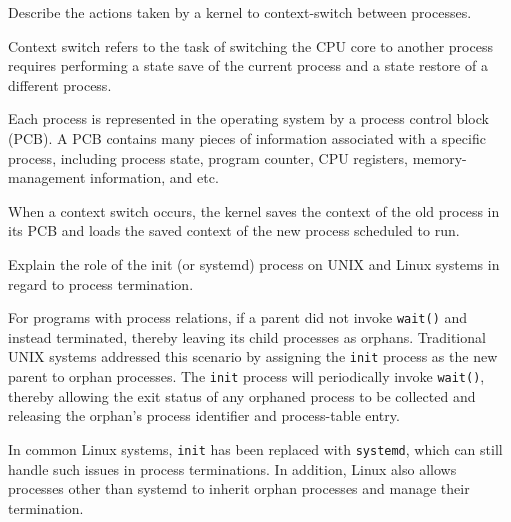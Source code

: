 \begin{exercise}[]{Describe the actions taken by a kernel to context-switch between processes.}
  \begin{solution}

Context switch refers to the task of switching the CPU core to another process requires performing a state save of the current process and a state restore of a different process.

    Each process is represented in the operating system by a process control block (PCB). A PCB contains many pieces of information associated with a specific process, including process state, program counter, CPU registers, memory-management information, and etc.
    
    When a context switch occurs, the kernel saves the context of the old process in its PCB and loads the saved context of the new process scheduled to run. 
  \end{solution}
  \label{ex4}
\end{exercise}


\begin{exercise}[]{Explain the role of the init (or systemd) process on UNIX and Linux
    systems in regard to process termination.
    }
  \begin{solution}
    For programs with process relations, if a parent did not invoke \texttt{wait()} and instead terminated, thereby leaving its child processes as orphans. Traditional UNIX systems addressed this scenario by assigning the \texttt{init} process as the new parent to orphan processes.  The \texttt{init} process will periodically invoke \texttt{wait()}, thereby allowing the exit status of any orphaned process to be collected and releasing the orphan’s process identifier and process-table entry.

    In common Linux systems, \texttt{init} has been replaced with \texttt{systemd}, which can still handle such issues in process terminations. In addition, Linux also allows processes other than systemd to inherit orphan processes and manage their termination.
  \end{solution}
  \label{ex5}
\end{exercise}
